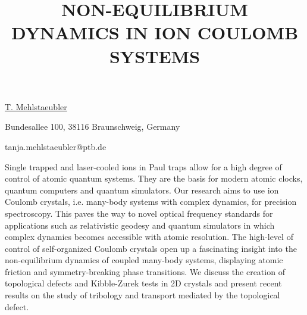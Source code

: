 \title{NON-EQUILIBRIUM DYNAMICS IN ION COULOMB SYSTEMS}

\underline{T. Mehlstaeubler}  

{\normalsize{\vspace{-4mm}
Bundesallee 100,
38116 Braunschweig,
Germany



\email tanja.mehlstaeubler@ptb.de}}

Single trapped and laser-cooled ions in Paul traps allow for a high degree of control of atomic quantum systems. They are the basis for modern atomic clocks, quantum computers and quantum simulators. Our research aims to use ion Coulomb crystals, i.e. many-body systems with complex dynamics, for precision spectroscopy. This paves the way to novel optical frequency standards for applications such as relativistic geodesy and quantum simulators in which complex dynamics becomes accessible with atomic resolution.
The high-level of control of self-organized Coulomb crystals open up a fascinating insight into the non-equilibrium dynamics of coupled many-body systems, displaying atomic friction and symmetry-breaking phase transitions. We discuss the creation of topological defects and Kibble-Zurek tests in 2D crystals and present recent results on the study of tribology and transport mediated by the topological defect.


\vspace{\baselineskip}